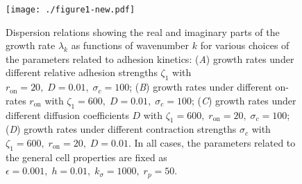 \documentclass[12pt]{article}
\begin{document}
        \begin{figure}[t]
            \centering
            \texttt{[image: ./figure1-new.pdf]}
            \caption{Dispersion relations showing the real and imaginary parts of the growth rate $\lambda_k$ as functions of wavenumber $k$ for various choices of the parameters related to adhesion kinetics: (\textit{A}) growth rates under different relative adhesion strengths $\zeta_1$ with $r_\text{on} = 20,\; D = 0.01,\;\sigma_c=100$; (\textit{B}) growth rates under different on-rates $r_\text{on}$ with $\zeta_1 = 600,\; D = 0.01,\;\sigma_c=100$; (\textit{C}) growth rates under different diffusion coefficients $D$ with $\zeta_1 = 600,\; r_\text{on} = 20,\;\sigma_c=100$; (\textit{D}) growth rates under different contraction strengths $\sigma_c$ with $\zeta_1 = 600,\; r_\text{on} = 20,\;D=0.01$. In all cases, the parameters related to the general cell properties are fixed as $\epsilon = 0.001,\;h = 0.01,\;k_\sigma = 1000,\; r_p = 50$. }
            \label{dispersion relations stick-slip}
        \end{figure}
        
\end{document}
